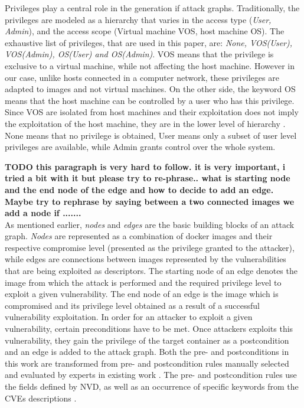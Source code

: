 Privileges play a central role in the generation if attack graphs. Traditionally, the privileges are modeled as a hierarchy that varies in the access type (\textit{User, Admin}), and the access scope (Virtual machine VOS, host machine OS). The exhaustive list of privileges, that are used in this paper, are: \textit{None, VOS(User), VOS(Admin), OS(User) and OS(Admin)}. VOS means that the privilege is exclusive to a virtual machine, while not affecting the host machine. However in our case, unlike hosts connected in a computer network, these privileges are adapted to images and not virtual machines. On the other side, the keyword OS means that the  host machine can be controlled by a user who has this privilege. Since VOS are isolated from host machines and their exploitation does not imply the exploitation of the host machine, they are in the lower level of hierarchy \cite{aksu2018automated}. None means that no privilege is obtained, User means only a subset of user level privileges are available, while Admin grants control over the whole system.

\textbf{TODO this paragraph is very hard to follow. it is very important, i tried a bit with it but please try to re-phrase.. what is starting node and the end node of the edge and how to decide to add an edge. Maybe try to rephrase by saying between a two connected images we add a node if .......}\\
As mentioned earlier, \textit{nodes} and \textit{edges} are the basic building blocks of an attack graph. \textit{Nodes} are represented as a combination of docker images and their respective compromise level (presented as the privilege granted to the attacker), while edges are connections between images represented by the vulnerabilities that are being exploited as descriptors. The starting node of an edge denotes the image from which the attack is performed and the required privilege level to exploit a given vulnerability. The end node of an edge is the image which is compromised and its privilege level obtained as a result of a successful vulnerability exploitation. In order for an attacker to exploit a given vulnerability, certain preconditions have to be met. Once attackers exploits this vulnerability, they gain the privilege of the target container as a postcondition and an edge is added to the attack graph. Both the pre- and postconditions in this work are transformed from pre- and postcondition rules manually selected and evaluated by experts in existing work \cite{aksu2018automated}. The pre- and postcondition rules use the fields defined by NVD, as well as an occurrence of specific keywords from the CVEs descriptions \cite{booth2013national}.

